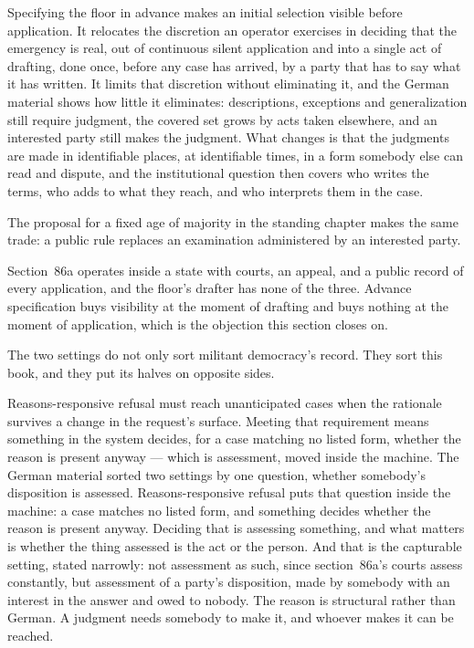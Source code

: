 Specifying the floor in advance makes an initial selection visible before application. It relocates the discretion an operator exercises in deciding that the emergency is real, out of continuous silent application and into a single act of drafting, done once, before any case has arrived, by a party that has to say what it has written. It limits that discretion without eliminating it, and the German material shows how little it eliminates: descriptions, exceptions and generalization still require judgment, the covered set grows by acts taken elsewhere, and an interested party still makes the judgment. What changes is that the judgments are made in identifiable places, at identifiable times, in a form somebody else can read and dispute, and the institutional question then covers who writes the terms, who adds to what they reach, and who interprets them in the case.

The proposal for a fixed age of majority in the standing chapter makes
the same trade: a public rule replaces an examination administered by an interested party.

Section~86a operates inside a state with courts, an appeal, and a public record of every application, and the floor's drafter has none of the three. Advance specification buys visibility at the moment of drafting and buys nothing at the moment of application, which is the objection this section closes on.

The two settings do not only sort militant democracy's record. They sort this book, and they put its halves on opposite sides.

Reasons-responsive refusal must reach unanticipated cases when the rationale survives a change in the request's surface. Meeting that requirement means something in the system decides, for a case matching no listed form, whether the reason is present anyway — which is assessment, moved inside the machine. The German material sorted two settings by one question, whether somebody's disposition is assessed. Reasons-responsive refusal puts that question inside the machine: a case matches no listed form, and something decides whether the reason is present anyway. Deciding that is assessing something, and what matters is whether the thing assessed is the act or the person. And that is the capturable setting, stated narrowly: not assessment as such, since section~86a's courts assess constantly, but assessment of a party's disposition, made by somebody with an interest in the answer and owed to nobody. The reason is structural rather than German. A judgment needs somebody to make it, and whoever makes it can be reached.

